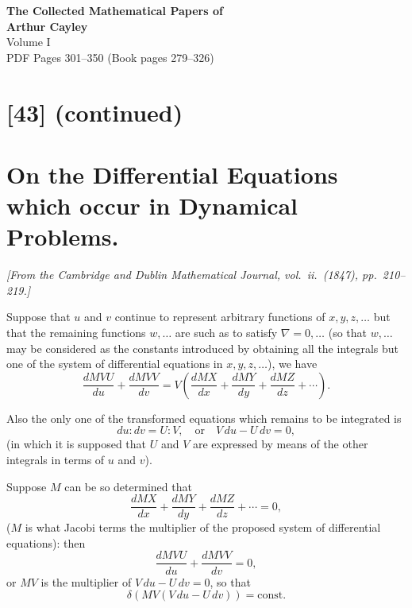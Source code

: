 \documentclass[12pt,a4paper]{article}
\begin{document}

\begin{center}
{\LARGE\bfseries The Collected Mathematical Papers of}\\[0.5em]
{\LARGE\bfseries Arthur Cayley}\\[1em]
{\Large Volume I}\\[1em]
{\large PDF Pages 301--350 \quad (Book pages 279--326)}\\[2em]
\end{center}

\tableofcontents
\newpage

\section*{[43] (continued)}
\section*{On the Differential Equations which occur in Dynamical Problems.}

\textit{[From the Cambridge and Dublin Mathematical Journal, vol.~ii.~(1847), pp.~210--219.]}

\bigskip
\setcounter{page}{279}

Suppose that $u$ and $v$ continue to represent arbitrary functions of $x,y,z,\ldots$ but that the remaining functions $w,\ldots$ are such as to satisfy $\nabla = 0,\ldots$ (so that $w,\ldots$ may be considered as the constants introduced by obtaining all the integrals but one of the system of differential equations in $x,y,z,\ldots$), we have
\[
\frac{dMVU}{du} + \frac{dMVV}{dv} = V\left(\frac{dMX}{dx} + \frac{dMY}{dy} + \frac{dMZ}{dz} + \cdots\right).
\]

Also the only one of the transformed equations which remains to be integrated is
\[
du : dv = U : V, \quad\text{or}\quad V\,du - U\,dv = 0,
\]
(in which it is supposed that $U$ and $V$ are expressed by means of the other integrals in terms of $u$ and $v$).

Suppose $M$ can be so determined that
\[
\frac{dMX}{dx} + \frac{dMY}{dy} + \frac{dMZ}{dz} + \cdots = 0,
\]
($M$ is what Jacobi terms the multiplier of the proposed system of differential equations): then
\[
\frac{dMVU}{du} + \frac{dMVV}{dv} = 0,
\]
or $MV$ is the multiplier of $V\,du - U\,dv = 0$, so that
\[
\delta(MV(V\,du - U\,dv)) = \text{const.}
\]
\end{document}
